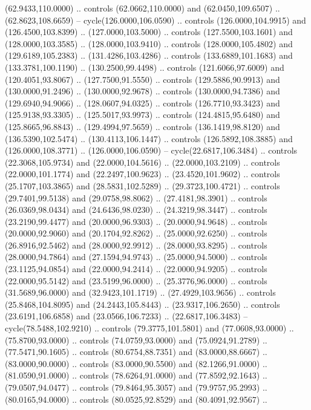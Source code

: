   (62.9433,110.0000) .. controls (62.0662,110.0000) and (62.0450,109.6507) ..
  (62.8623,108.6659) -- cycle(126.0000,106.0590) .. controls (126.0000,104.9915)
  and (126.4500,103.8399) .. (127.0000,103.5000) .. controls (127.5500,103.1601)
  and (128.0000,103.3585) .. (128.0000,103.9410) .. controls (128.0000,105.4802)
  and (129.6189,105.2383) .. (131.4286,103.4286) .. controls (133.6889,101.1683)
  and (133.3781,100.1190) .. (130.2500,99.4498) .. controls (121.6066,97.6009)
  and (120.4051,93.8067) .. (127.7500,91.5550) .. controls (129.5886,90.9913)
  and (130.0000,91.2496) .. (130.0000,92.9678) .. controls (130.0000,94.7386)
  and (129.6940,94.9066) .. (128.0607,94.0325) .. controls (126.7710,93.3423)
  and (125.9138,93.3305) .. (125.5017,93.9973) .. controls (124.4815,95.6480)
  and (125.8665,96.8843) .. (129.4994,97.5659) .. controls (136.1419,98.8120)
  and (136.5390,102.5474) .. (130.4113,106.1447) .. controls (126.5892,108.3885)
  and (126.0000,108.3771) .. (126.0000,106.0590) -- cycle(22.6817,106.3484) ..
  controls (22.3068,105.9734) and (22.0000,104.5616) .. (22.0000,103.2109) ..
  controls (22.0000,101.1774) and (22.2497,100.9623) .. (23.4520,101.9602) ..
  controls (25.1707,103.3865) and (28.5831,102.5289) .. (29.3723,100.4721) ..
  controls (29.7401,99.5138) and (29.0758,98.8062) .. (27.4181,98.3901) ..
  controls (26.0369,98.0434) and (24.6436,98.0230) .. (24.3219,98.3447) ..
  controls (23.2190,99.4477) and (20.0000,96.9303) .. (20.0000,94.9648) ..
  controls (20.0000,92.9060) and (20.1704,92.8262) .. (25.0000,92.6250) ..
  controls (26.8916,92.5462) and (28.0000,92.9912) .. (28.0000,93.8295) ..
  controls (28.0000,94.7864) and (27.1594,94.9743) .. (25.0000,94.5000) ..
  controls (23.1125,94.0854) and (22.0000,94.2414) .. (22.0000,94.9205) ..
  controls (22.0000,95.5142) and (23.5199,96.0000) .. (25.3776,96.0000) ..
  controls (31.5689,96.0000) and (32.9423,101.1719) .. (27.4929,103.9656) ..
  controls (25.8468,104.8095) and (24.2443,105.8443) .. (23.9317,106.2650) ..
  controls (23.6191,106.6858) and (23.0566,106.7233) .. (22.6817,106.3483) --
  cycle(78.5488,102.9210) .. controls (79.3775,101.5801) and (77.0608,93.0000)
  .. (75.8700,93.0000) .. controls (74.0759,93.0000) and (75.0924,91.2789) ..
  (77.5471,90.1605) .. controls (80.6754,88.7351) and (83.0000,88.6667) ..
  (83.0000,90.0000) .. controls (83.0000,90.5500) and (82.1266,91.0000) ..
  (81.0590,91.0000) .. controls (78.6264,91.0000) and (77.8592,92.1643) ..
  (79.0507,94.0477) .. controls (79.8464,95.3057) and (79.9757,95.2993) ..
  (80.0165,94.0000) .. controls (80.0525,92.8529) and (80.4091,92.9567) ..
